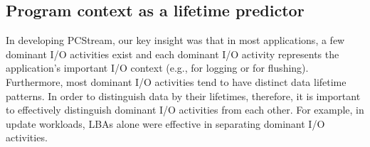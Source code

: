 \subsection{Program context as a lifetime predictor}
In developing \textsf{\small PCStream}, our key insight was that in most applications,
a few dominant I/O activities exist
and each dominant I/O activity   
represents the application's important I/O context (e.g., for logging or for flushing). 
Furthermore, most dominant I/O activities tend to have distinct data lifetime patterns.
In order to distinguish data by their lifetimes, therefore, 
it is important to effectively distinguish dominant I/O activities from each other.  
For example, in update workloads, 
LBAs alone were effective in separating dominant I/O activities.  

